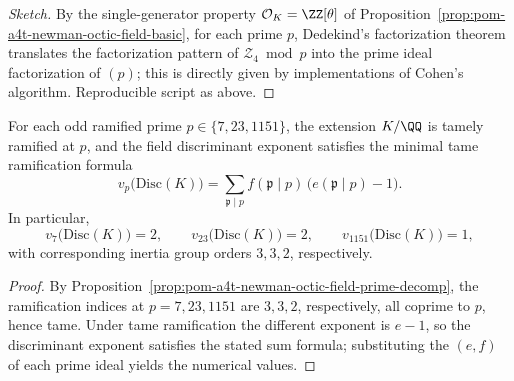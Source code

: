 \begin{proof}[Sketch]
By the single-generator property \(\mathcal O_K=\ZZ[\theta]\) of Proposition~\ref{prop:pom-a4t-newman-octic-field-basic}, for each prime \(p\), Dedekind's factorization theorem translates the factorization pattern of \(\mathcal Z_4\bmod p\) into the prime ideal factorization of \((p)\); this is directly given by implementations of Cohen's algorithm.
Reproducible script as above.
\end{proof}

\begin{corollary}\label{cor:pom-a4t-newman-octic-field-tame}
For each odd ramified prime \(p\in\{7,23,1151\}\), the extension \(K/\QQ\) is tamely ramified at \(p\), and the field discriminant exponent satisfies the minimal tame ramification formula
\[
v_p\!\bigl(\mathrm{Disc}(K)\bigr)=\sum_{\mathfrak p\mid p} f(\mathfrak p\mid p)\,\bigl(e(\mathfrak p\mid p)-1\bigr).
\]
In particular,
\[
v_7\!\bigl(\mathrm{Disc}(K)\bigr)=2,\qquad v_{23}\!\bigl(\mathrm{Disc}(K)\bigr)=2,\qquad v_{1151}\!\bigl(\mathrm{Disc}(K)\bigr)=1,
\]
with corresponding inertia group orders \(3,3,2\), respectively.
\end{corollary}
\begin{proof}
By Proposition~\ref{prop:pom-a4t-newman-octic-field-prime-decomp}, the ramification indices at \(p=7,23,1151\) are \(3,3,2\), respectively, all coprime to \(p\), hence tame.
Under tame ramification the different exponent is \(e-1\), so the discriminant exponent satisfies the stated sum formula; substituting the \((e,f)\) of each prime ideal yields the numerical values.
\end{proof}

